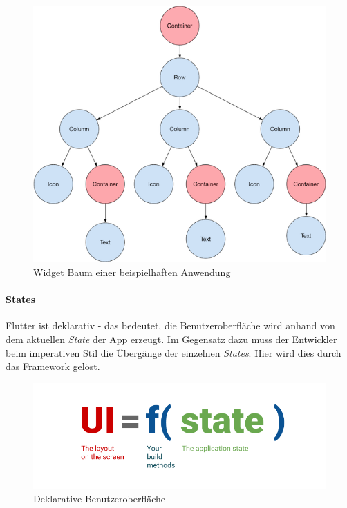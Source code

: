 \begin{figure}[tbt]
	\begin{center}
		\includegraphics[scale=0.5]{images/flutter_widget_tree.png}
	\end{center}
	\caption{Widget Baum einer beispielhaften Anwendung \protect \footnotemark}
	\label{fig:flutter_widget_tree}
\end{figure}
	

\paragraph{States}
Flutter ist deklarativ - das bedeutet, die Benutzeroberfläche wird anhand von dem aktuellen \textit{State} der App erzeugt. Im Gegensatz dazu muss der Entwickler beim imperativen Stil die Übergänge der einzelnen \textit{States}. Hier wird dies durch das Framework gelöst.
	
\begin{figure}[H]
	\begin{center}
		\includegraphics[scale=0.4]{images/flutter_state.png}
	\end{center}
	\caption{Deklarative Benutzeroberfläche \protect \footnotemark}
	\label{fig:flutter_state}
\end{figure}







